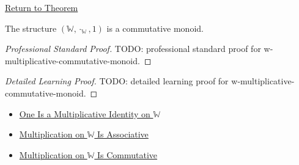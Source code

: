 \newpage
{}
\label{prf:w-multiplicative-commutative-monoid}

\begin{remark*}[Return]
\hyperref[thm:w-multiplicative-commutative-monoid]{Return to Theorem}
\end{remark*}

\begin{theorem*}
The structure $(\mathbb{W},\cdot_{\mathbb{W}},1)$ is a commutative monoid.
\end{theorem*}

\begin{proof}[Professional Standard Proof]
\LRAProofBodyStart
TODO: professional standard proof for w-multiplicative-commutative-monoid.
\end{proof}

\begin{proof}[Detailed Learning Proof]
\LRAProofBodyStart
TODO: detailed learning proof for w-multiplicative-commutative-monoid.
\end{proof}

\begin{remark*}
\end{remark*}

\begin{dependencies}
\begin{itemize}
  \item \hyperref[thm:one-multiplicative-identity-on-w]{One Is a Multiplicative Identity on $\mathbb{W}$}
  \item \hyperref[thm:multiplication-on-w-associative]{Multiplication on $\mathbb{W}$ Is Associative}
  \item \hyperref[thm:multiplication-on-w-commutative]{Multiplication on $\mathbb{W}$ Is Commutative}
\end{itemize}
\end{dependencies}

\clearpage
